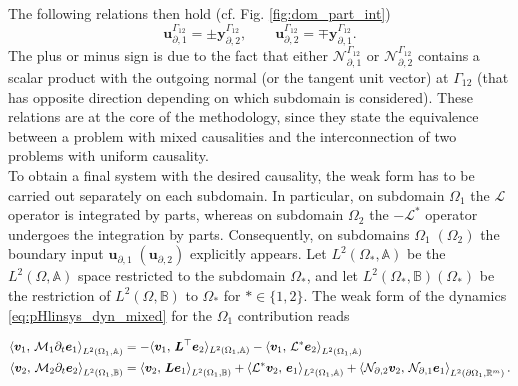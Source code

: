 The following relations then hold (cf. Fig. \ref{fig:dom_part_int})
\begin{equation}\label{eq:int_var}
\bm{u}_{\partial, 1}^{\Gamma_{12}} =\pm \bm{y}_{\partial, 2}^{\Gamma_{12}}, \qquad \bm{u}_{\partial, 2}^{\Gamma_{12}} = \mp \bm{y}_{\partial, 1}^{\Gamma_{12}}.
\end{equation}
The plus or minus sign is due to the fact that either $\mathcal{N}_{\partial, 1}^{\Gamma_{12}}$ or $\mathcal{N}_{\partial, 2}^{\Gamma_{12}}$ contains a scalar product with the outgoing normal (or the tangent unit vector) at ${\Gamma_{12}}$ (that has opposite direction depending on which subdomain is considered). These relations are at the core of the methodology, since they state the equivalence between a problem with mixed causalities and the interconnection of two problems with uniform causality.   \\

To obtain a final system with the desired causality, the weak form has to be carried out separately on each subdomain. In particular, on subdomain $\Omega_1$ the $\mathcal{L}$ operator is integrated by parts, whereas on subdomain $\Omega_2$ the $-\mathcal{L}^*$ operator undergoes the integration by parts. Consequently, on subdomains $\Omega_1 \; (\Omega_2)$ the boundary input $\bm{u}_{\partial, 1} \; (\bm{u}_{\partial, 2})$ explicitly appears. Let $L^2(\Omega_*, \mathbb{A})$ be the $L^2(\Omega, \mathbb{A})$ space restricted to the subdomain $\Omega_*$, and let $L^2(\Omega_*, \mathbb{B})({\Omega_*})$ be the restriction of $L^2(\Omega, \mathbb{B})$ to $\Omega_*$ for $* \in \{1,2\}$. The weak form of the dynamics \eqref{eq:pHlinsys_dyn_mixed} for the $\Omega_1$ contribution reads

\begin{equation}\label{eq:pHlinsys_weak_Om1}
\begin{aligned}
\inner[L^2(\Omega_1, \mathbb{A})]{\bm{v}_1}{\mathcal{M}_1 \partial_t \bm{e}_1} &=   -  \langle{\bm{v}_1}, \,{\bm{L}^\top \bm{e}_2}\rangle_{L^2(\Omega_1, \mathbb{A})}  -\inner[L^2(\Omega_1, \mathbb{A})]{\bm{v}_1}{\mathcal{L}^*\bm{e}_2}  \\
\inner[L^2(\Omega_1, \mathbb{B})]{\bm{v}_2}{\mathcal{M}_2 \partial_t \bm{e}_2} &=   \inner[L^2(\Omega_1, \mathbb{B})]{\bm{v}_2}{\bm{L}\bm{e}_1} + \inner[L^2(\Omega_1, \mathbb{A})]{\mathcal{L}^*\bm{v}_2}{\bm{e}_1} + \inner[L^2(\partial\Omega_1, \mathbb{R}^m)]{\mathcal{N}_{\partial, 2} \bm{v}_2}{\mathcal{N}_{\partial, 1}\bm{e}_1}. \\
\end{aligned}
\end{equation}

